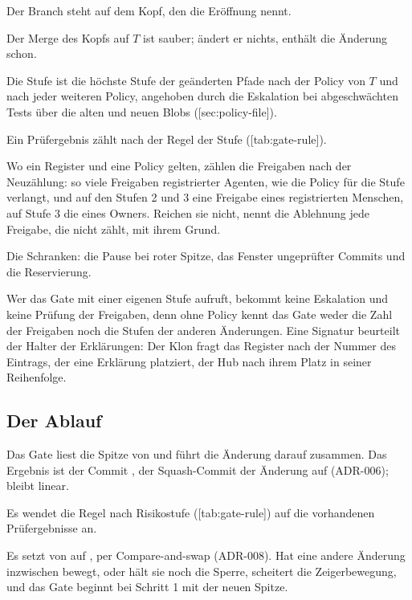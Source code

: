 \startitemize[n]
\item Der Branch steht auf dem Kopf, den die Eröffnung nennt.
\item Der Merge des Kopfs auf $T$ ist sauber; ändert er nichts, enthält  die Änderung
schon.
\item Die Stufe ist die höchste Stufe der geänderten Pfade nach der Policy von $T$ und nach jeder
weiteren Policy, angehoben durch die Eskalation bei abgeschwächten Tests über die alten und neuen
Blobs ([sec:policy-file]).
\item Ein Prüfergebnis zählt nach der Regel der Stufe ([tab:gate-rule]).
\item Wo ein Register und eine Policy gelten, zählen die Freigaben nach der Neuzählung: so viele
Freigaben registrierter Agenten, wie die Policy für die Stufe verlangt, und auf den Stufen 2
und 3 eine Freigabe eines registrierten Menschen, auf Stufe 3 die eines Owners.
Reichen sie nicht, nennt die Ablehnung jede Freigabe, die nicht zählt, mit ihrem Grund.
\item Die Schranken: die Pause bei roter Spitze, das Fenster ungeprüfter Commits und die
Reservierung.
\stopitemize

Wer das Gate mit einer eigenen Stufe aufruft, bekommt keine Eskalation und keine Prüfung der
Freigaben, denn ohne Policy kennt das Gate weder die Zahl der Freigaben noch die Stufen der
anderen Änderungen.
Eine Signatur beurteilt der Halter der Erklärungen: Der Klon fragt das Register nach der Nummer
des Eintrags, der eine Erklärung platziert, der Hub nach ihrem Platz in seiner Reihenfolge.

\subsection{Der Ablauf}

\startitemize[n]
\item Das Gate liest die Spitze  von  und führt die Änderung darauf zusammen.
Das Ergebnis ist der Commit , der Squash-Commit der Änderung auf 
(ADR-006);  bleibt linear.
\item Es wendet die Regel nach Risikostufe ([tab:gate-rule])
auf die vorhandenen Prüfergebnisse an.
\item Es setzt  von  auf , per Compare-and-swap (ADR-008).
Hat eine andere Änderung  inzwischen bewegt, oder hält sie noch die Sperre,
scheitert die Zeigerbewegung, und das Gate beginnt bei Schritt 1 mit der neuen Spitze.
\stopitemize


